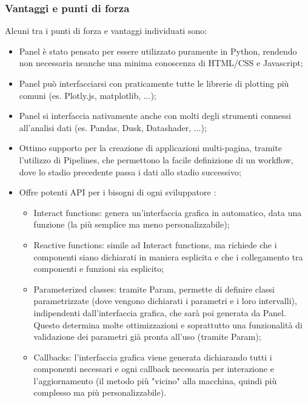 \subsubsection{Vantaggi e punti di forza}
Alcuni tra i punti di forza e vantaggi individuati sono:
\begin{itemize}
\item Panel è stato pensato per essere utilizzato puramente in Python, rendendo non necessaria neanche una minima conoscenza di HTML/CSS e Javascript;

\item Panel può interfacciarsi con praticamente tutte le librerie di plotting più comuni (es. Plotly.js, matplotlib, ...);

\item Panel si interfaccia nativamente anche con molti degli strumenti connessi all'analisi dati (es. Pandas, Dusk, Datashader, ...);

\item Ottimo supporto per la creazione di applicazioni multi-pagina, tramite l'utilizzo di Pipelines, che permettono la facile definizione di un workflow, dove lo stadio precedente passa i dati allo stadio successivo;

\item Offre potenti \gls{API} per i bisogni di ogni sviluppatore \cite{site:panel-apis}:
	\begin{itemize}
		\item Interact functions: genera un'interfaccia grafica in automatico, data una funzione (la più semplice ma meno personalizzabile);
		
		\item Reactive functions: simile ad Interact functions, ma richiede che i componenti siano dichiarati in maniera esplicita e che i collegamento tra componenti e funzioni sia esplicito;
		
		\item Parameterized classes: tramite Param, permette di definire classi parametrizzate (dove vengono dichiarati i parametri e i loro intervalli), indipendenti dall'interfaccia grafica, che sarà poi generata da Panel. Questo determina molte ottimizzazioni e soprattutto una funzionalità di validazione dei parametri già pronta all'uso (tramite Param);
		
		\item Callbacks: l'interfaccia grafica viene generata dichiarando tutti i componenti necessari e ogni callback necessaria per interazione e l'aggiornamento (il metodo più "vicino" alla macchina, quindi più complesso ma più personalizzabile).
	

\end{itemize}
\end{itemize}
